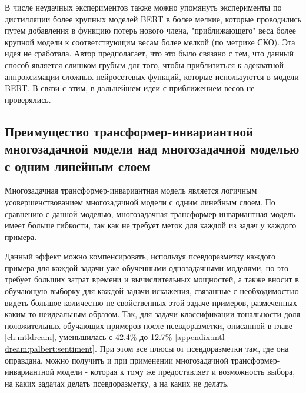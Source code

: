 В числе неудачных экспериментов также можно упомянуть эксперименты по дистилляции более крупных моделей BERT в более мелкие, которые проводились путем добавления в функцию потерь нового члена, "приближающего" веса более крупной модели к соответствующим весам более мелкой (по метрике СКО). Эта идея не сработала. Автор предполагает, что это было связано с тем, что данный способ является слишком грубым для того, чтобы приблизиться к адекватной аппроксимации сложных нейросетевых функций, которые используются в модели BERT. В связи с этим, в дальнейшем идеи с приближением весов не проверялись. 
\subsection{Преимущество трансформер-инвариантной многозадачной модели над многозадачной моделью с одним линейным слоем}
\label{ch:tr-ag:advantages}

Многозадачная трансформер-инвариантная модель является логичным усовершенствованием многозадачной модели с одним линейным слоем. По сравнению с данной моделью, многозадачная трансформер-инвариантная модель имеет больше гибкости, так как не требует меток для каждой из задач у каждого примера. %

Данный эффект можно компенсировать, используя псевдоразметку каждого примера для каждой задачи уже обученными однозадачными моделями, но это требует больших затрат времени и вычислительных мощностей, а также вносит в обучающую выборку для каждой задачи искажения, связанные с необходимостью видеть большое количество не свойственных этой задаче примеров, размеченных каким-то неидеальным образом. Так, для задачи классификации тональности доля положительных обучающих примеров после псевдоразметки, описанной в главе \ref{ch:mtldream}, уменьшилась с 42.4\% до 12.7\% \ref{appendix:mtl-dream:palbert:sentiment}. При этом все плюсы от псевдоразметки там, где она оправдана, можно получить и при применении многозадачной трансформер-инвариантной модели - которая к тому же предоставляет и возможность выбора, на каких задачах делать псевдоразметку, а на каких не делать.

